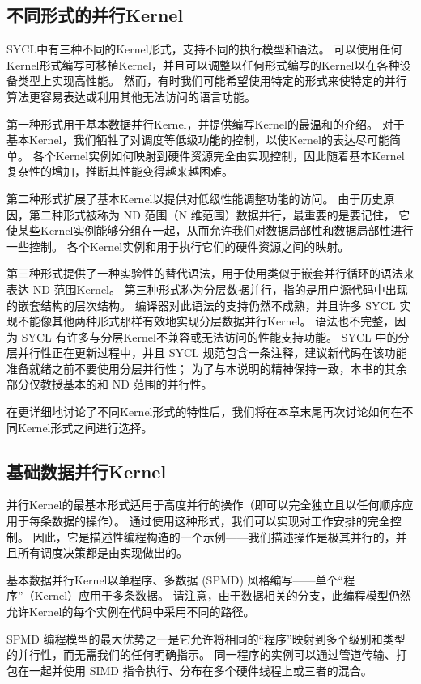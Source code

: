 \subsection{不同形式的并行Kernel}
SYCL中有三种不同的Kernel形式，支持不同的执行模型和语法。 
可以使用任何Kernel形式编写可移植Kernel，并且可以调整以任何形式编写的Kernel以在各种设备类型上实现高性能。 
然而，有时我们可能希望使用特定的形式来使特定的并行算法更容易表达或利用其他无法访问的语言功能。

第一种形式用于基本数据并行Kernel，并提供编写Kernel的最温和的介绍。 
对于基本Kernel，我们牺牲了对调度等低级功能的控制，以使Kernel的表达尽可能简单。 
各个Kernel实例如何映射到硬件资源完全由实现控制，因此随着基本Kernel复杂性的增加，推断其性能变得越来越困难。

第二种形式扩展了基本Kernel以提供对低级性能调整功能的访问。 
由于历史原因，第二种形式被称为 ND 范围（N 维范围）数据并行，最重要的是要记住，
它使某些Kernel实例能够分组在一起，从而允许我们对数据局部性和数据局部性进行一些控制。 
各个Kernel实例和用于执行它们的硬件资源之间的映射。

第三种形式提供了一种实验性的替代语法，用于使用类似于嵌套并行循环的语法来表达 ND 范围Kernel。 
第三种形式称为分层数据并行，指的是用户源代码中出现的嵌套结构的层次结构。 
编译器对此语法的支持仍然不成熟，并且许多 SYCL 实现不能像其他两种形式那样有效地实现分层数据并行Kernel。 
语法也不完整，因为 SYCL 有许多与分层Kernel不兼容或无法访问的性能支持功能。 
SYCL 中的分层并行性正在更新过程中，并且 SYCL 规范包含一条注释，建议新代码在该功能准备就绪之前不要使用分层并行性； 
为了与本说明的精神保持一致，本书的其余部分仅教授基本的和 ND 范围的并行性。

在更详细地讨论了不同Kernel形式的特性后，我们将在本章末尾再次讨论如何在不同Kernel形式之间进行选择。

\subsection{基础数据并行Kernel}
并行Kernel的最基本形式适用于高度并行的操作（即可以完全独立且以任何顺序应用于每条数据的操作）。 
通过使用这种形式，我们可以实现对工作安排的完全控制。 
因此，它是描述性编程构造的一个示例——我们描述操作是极其并行的，并且所有调度决策都是由实现做出的。

基本数据并行Kernel以单程序、多数据 (SPMD) 风格编写——单个“程序”（Kernel）应用于多条数据。 
请注意，由于数据相关的分支，此编程模型仍然允许Kernel的每个实例在代码中采用不同的路径。

SPMD 编程模型的最大优势之一是它允许将相同的“程序”映射到多个级别和类型的并行性，而无需我们的任何明确指示。 
同一程序的实例可以通过管道传输、打包在一起并使用 SIMD 指令执行、分布在多个硬件线程上或三者的混合。


